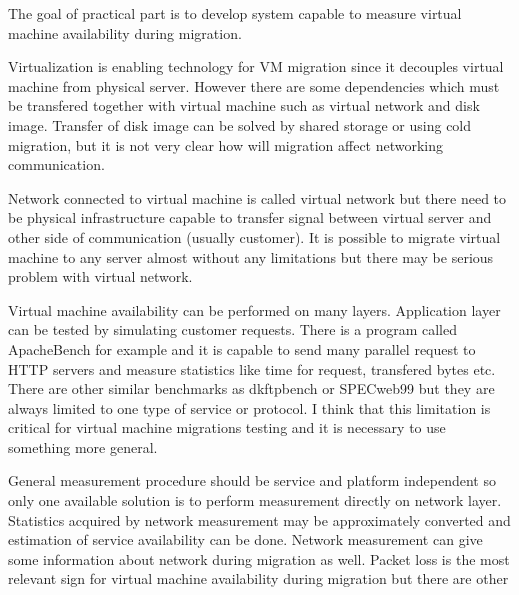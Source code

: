 
The goal of practical part is to develop system capable to measure virtual machine availability during migration. 

Virtualization is enabling technology for \Ac{VM} migration since it decouples virtual machine from physical server. However there are some dependencies which must be transfered together with virtual machine such as virtual network and disk image. Transfer of disk image can be solved by shared storage or using cold migration, but it is not very clear how will migration affect networking communication.

Network connected to virtual machine is called virtual network but there need to be physical infrastructure capable to transfer signal between virtual server and other side of communication (usually customer). It is possible to migrate virtual machine to any server almost without any limitations but there may be serious problem with virtual network. 

Virtual machine availability can be performed on many layers. Application layer can be tested by simulating customer requests. There is a program called ApacheBench for example and it is capable to send many parallel request to \Ac{HTTP} servers and measure statistics like time for request, transfered bytes etc. There are other similar benchmarks as dkftpbench or SPECweb99 but they are always limited to one type of service or protocol. I think that this limitation is critical for virtual machine migrations testing and it is necessary to use something more general.

General measurement procedure should be service and platform independent so only one available solution is to perform measurement directly on network layer. Statistics acquired by network measurement may be approximately converted and estimation of service availability can be done. Network measurement can give some information about network during migration as well. Packet loss is the most relevant sign for virtual machine availability during migration but there are other 






